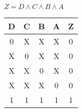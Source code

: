 
\begin{center}
    {\(Z = D \land C \land B \land A \)}
    \begin{table}[h] %
        \begin{center}
            \begin{tabular}{|c|c|c|c||c|} \hline
            D & C & B & A & Z \\ \hline\hline
            0 & X & X & X & 0 \\ \hline
            X & 0 & X & X & 0 \\ \hline
            X & X & 0 & X & 0 \\ \hline
            X & X & X & 0 & 0 \\ \hline
            1 & 1 & 1 & 1 & 1 \\ \hline
            \end{tabular}
        \end{center}
    \end{table}
\end{center}
